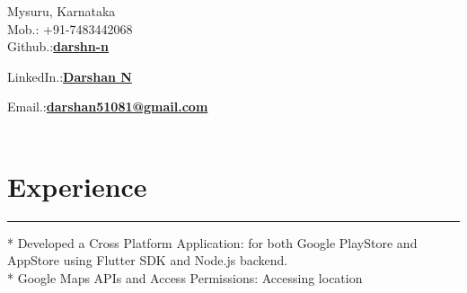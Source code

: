 \documentclass[]{rahulworld-resume}
\begin{document}
\hfill
\begin{minipage}[t]{0.66\textwidth} 

\hspace*{0pt}\hfill Mysuru, Karnataka\\
\hspace*{0pt}\hfill Mob.: +91-7483442068 \\
\hspace*{0pt}\hfill Github.:\textbf{\href{https://github.com/darshn-n}{darshn-n}} 

\hspace*{0pt}\hfill 
\hspace*{0pt}\hfill LinkedIn.:\textbf{\href{https://www.linkedin.com/in/darshn-n/}{Darshan N}} 
 

\hspace*{0pt}\hfill 
Email.:\textbf{\href{mailto:darshan51081@gmail.com}{darshan51081@gmail.com}} \\
 \\
\section{Experience}
\noindent\rule{12.5cm}{0.4pt}
 
\noindent
\hspace{5em}%
\begin{minipage}{0.85\textwidth\vspace{2pt}}
* Developed a Cross Platform Application: for both Google PlayStore and AppStore using Flutter SDK and Node.js
backend.\\
* Google Maps APIs and Access Permissions: Accessing location
\end{minipage}
\sectionsep



\end{minipage}
\end{document}

